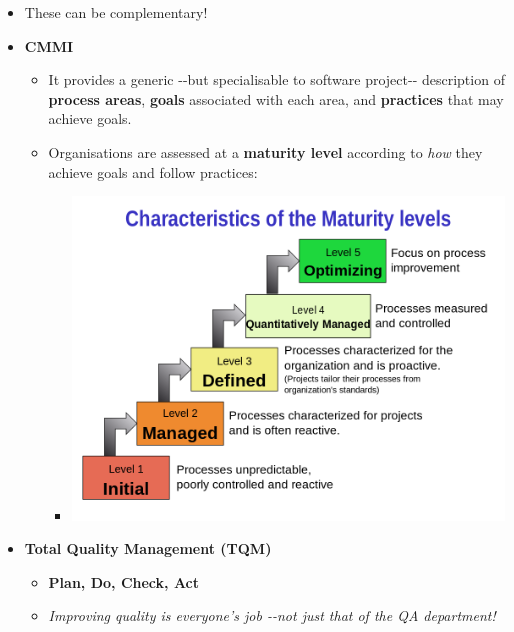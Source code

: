 \documentclass[a4paper]{article}
\providecommand{\tightlist}{%
  \setlength{\itemsep}{0pt}\setlength{\parskip}{0pt}}
\begin{document}
\begin{itemize}
\item
  These can be complementary!
\item
  \textbf{CMMI}

  \begin{itemize}
  \tightlist
  \item
    It provides a generic -\/-but specialisable to software project-\/-
    description of \textbf{process areas}, \textbf{goals} associated
    with each area, and \textbf{practices} that may achieve goals.
  \item
    Organisations are assessed at a \textbf{maturity level} according to
    \emph{how} they achieve goals and follow practices:

    \begin{itemize}
    \tightlist
    \item
      \includegraphics{2C-SE.assets/1024px-Characteristics_of_Capability_Maturity_Model.svg.png}
    \end{itemize}
  \end{itemize}
\item
  \textbf{Total Quality Management (TQM)}

  \begin{itemize}
  \tightlist
  \item
    \textbf{Plan, Do, Check, Act}
  \item
    \emph{Improving quality is everyone's job -\/-not just that of the
    QA department!}
  \end{itemize}


\end{itemize}
\end{document}
